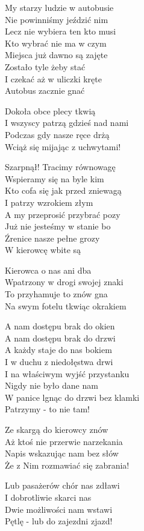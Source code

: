 \begin{text}
    My starzy ludzie w autobusie\\
    Nie powinniśmy jeździć nim\\
    Lecz nie wybiera ten kto musi\\
    Kto wybrać nie ma w czym\\
    Miejsca już dawno są zajęte\\
    Zostało tyle żeby stać\\
    I czekać aż w uliczki kręte\\
    Autobus zacznie gnać

    Dokoła obce plecy tkwią\\
    I wszyscy patrzą gdzieś nad nami\\
    Podczas gdy nasze ręce drżą\\
    Wciąż się mijając z uchwytami!

    Szarpnął! Tracimy równowagę\\
    Wspieramy się na byle kim\\
    Kto cofa się jak przed zniewagą\\
    I patrzy wzrokiem złym\\
    A my przeprosić przybrać pozy\\
    Już nie jesteśmy w stanie bo\\
    Źrenice nasze pełne grozy\\
    W kierowcę wbite są

    Kierowca o nas ani dba\\
    Wpatrzony w drogi swojej znaki\\
    To przyhamuje to znów gna\\
    Na swym fotelu tkwiąc okrakiem

    A nam dostępu brak do okien\\
    A nam dostępu brak do drzwi\\
    A każdy staje do nas bokiem\\
    I w duchu z niedołęstwa drwi\\
    I na właściwym wyjść przystanku\\
    Nigdy nie było dane nam\\
    W panice lgnąc do drzwi bez klamki\\
    Patrzymy - to nie tam!

    Ze skargą do kierowcy znów\\
    Aż ktoś nie przerwie narzekania\\
    Napis wskazując nam bez słów\\
    Że z Nim rozmawiać się zabrania!

    Lub pasażerów chór nas zdławi\\
    I dobrotliwie skarci nas\\
    Dwie możliwości nam wstawi\\
    Pętlę - lub do zajezdni zjazd!
\end{text}
